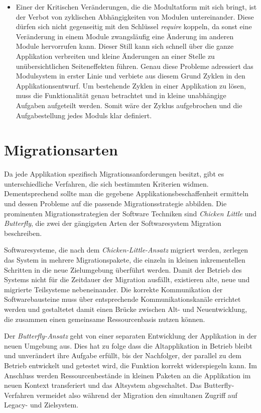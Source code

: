 \begin{itemize}
	\item Einer der Kritischen Veränderungen, die die Modultatform mit sich bringt, ist der Verbot von zyklischen Abhängigkeiten von Modulen untereinander. Diese dürfen sich nicht gegenseitig mit den Schlüssel \textit{require} koppeln, da sonst eine Veränderung in einem Module zwangsläufig eine Änderung im anderen Module hervorrufen kann. Dieser Still kann sich schnell über die ganze Applikation verbreiten und kleine Änderungen an einer Stelle zu unübersichtlichen Seiteneffekten führen. Genau diese Probleme adressiert das Modulsystem in erster Linie und verbiete aus diesem Grund Zyklen in den Applikationsentwurf. Um bestehende Zyklen in einer Applikation zu lösen, muss die Funktionalität genau betrachtet und in kleine unabhängige Aufgaben aufgeteilt werden. Somit wäre der Zyklus aufgebrochen und die Aufgabestellung jedes Moduls klar definiert. 
\end{itemize}

\section{Migrationsarten} \label{Migratiosarten}

	Da jede Applikation spezifisch Migrationsanforderungen besitzt, gibt es unterschiedliche Verfahren, die sich bestimmten Kriterien widmen. Dementsprechend sollte man die gegebene Applikationsbeschaffenheit ermitteln und dessen Probleme auf die passende Migrationsstrategie abbilden. Die prominenten Migrationsstrategien der Software Techniken sind \textit{Chicken Little} und \textit{Butterfly}, die zwei der gängigsten Arten der Softwaresystem Migration beschreiben.\bigbreak


	Softwaresysteme, die nach dem \textit{Chicken-Little-Ansatz} migriert werden, zerlegen das System in mehrere Migrationspakete, die einzeln in kleinen inkrementellen Schritten in die neue Zielumgebung überführt werden. Damit der Betrieb des Systems nicht für die Zeitdauer der Migration ausfällt, existieren alte, neue und migrierte Teilsysteme nebeneinander. Die korrekte Kommunikation der Softwarebausteine muss über entsprechende Kommunikationskanäle errichtet werden und gestaltetet damit einen Brücke zwischen Alt- und Neuentwicklung, die zusammen einen gemeinsame Ressourcenbasis nutzen können. \bigbreak

	Der \textit{Butterfly-Ansatz} geht von einer separaten Entwicklung der Applikation in der neuen Umgebung aus. Dies hat zu folge dass die Altapplikation in Betrieb bleibt und unverändert ihre Aufgabe erfüllt, bis der Nachfolger, der parallel zu dem Betrieb entwickelt und getestet wird, die Funktion korrekt widerspiegeln kann. Im Anschluss werden Ressourcenbestände in kleinen Paketen an die Applikation im neuen Kontext transferiert und das Altsystem abgeschaltet. Das Butterfly-Verfahren vermeidet also während der Migration den simultanen Zugriff auf Legacy- und Zielsystem. \bigbreak

